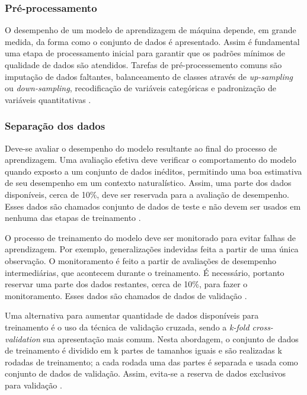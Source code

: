 \subsubsection{Pré-processamento}

O desempenho de um modelo de aprendizagem de máquina depende, em grande medida, da forma como o conjunto de dados é apresentado. Assim é fundamental uma etapa
de processamento inicial para garantir que os padrões mínimos de qualidade de dados são atendidos. Tarefas de pré-processemento comuns são imputação de dados
faltantes, balanceamento de classes através de \textit{up-sampling} ou \textit{down-sampling}, recodificação de variáveis categóricas e padronização
de variáveis quantitativas \cite{Delgadillo2020}.

\subsubsection{Separação dos dados}

Deve-se avaliar o desempenho do modelo resultante ao final do processo de aprendizagem. Uma avaliação efetiva deve verificar o comportamento do modelo quando
exposto a um conjunto de dados inéditos, permitindo uma boa estimativa de seu desempenho em um contexto naturalístico. Assim, uma parte dos dados disponíveis,
cerca de 10\%, deve ser reservada para a avaliação de desempenho. Esses dados são chamados conjunto de dados de teste e não devem ser usados em nenhuma das
etapas de treinamento \cite{Greener2021}. 

O processo de treinamento do modelo deve ser monitorado para evitar falhas de aprendizagem. Por exemplo, generalizações indevidas feita a partir de uma única
observação.  O monitoramento é feito a partir de avaliações de desempenho intermediárias, que acontecem durante o treinamento. É necessário, portanto reservar
uma parte dos dados restantes, cerca de 10\%, para fazer o monitoramento. Esses dados são chamados de dados de validação \cite{Greener2021}.

Uma alternativa para aumentar quantidade de dados disponíveis para treinamento é o uso da técnica de validação cruzada, sendo a \textit{k-fold cross-validation}
sua apresentação mais comum. Nesta abordagem, o conjunto de dados de treinamento é dividido em k partes de tamanhos iguais e são realizadas k rodadas de treinamento;
a cada rodada uma das partes é separada e usada como conjunto de dados de validação. Assim, evita-se a reserva de dados exclusivos para validação \cite{Delgadillo2020}.

